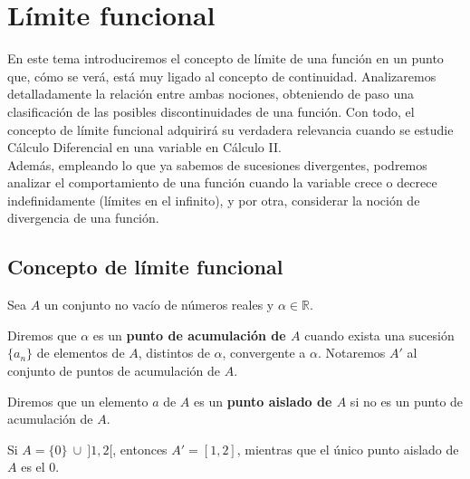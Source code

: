 
\chapter{Límite funcional}\label{chp:Tema13}

En este tema introduciremos el concepto de límite de una función en un punto que, cómo se verá, está muy ligado al concepto de continuidad. Analizaremos detalladamente la relación entre ambas nociones, obteniendo de paso una clasificación de las posibles discontinuidades de una función. Con todo, el concepto de límite funcional adquirirá su verdadera relevancia cuando se estudie Cálculo Diferencial en una variable en Cálculo II.\\

Además, empleando lo que ya sabemos de sucesiones divergentes, podremos analizar el comportamiento de una función cuando la variable crece o decrece indefinidamente (límites en el infinito), y por otra, considerar la noción de divergencia de una función.


\section{Concepto de límite funcional}
\begin{definicion}
    Sea $A$ un conjunto no vacío de números reales y $\alpha \in \mathbb{R}$.
    
    Diremos que $\alpha$ es un \textbf{punto de acumulación de $A$} cuando exista una sucesión $\{a_n\}$ de elementos de $A$,
    distintos de $\alpha$, convergente a $\alpha$. Notaremos $A'$ al conjunto de puntos de acumulación de $A$.
    
    Diremos que un elemento $a$ de $A$ es un \textbf{punto aislado de $A$} si no es un punto de acumulación de $A$.
\end{definicion}
\begin{ejemplo}
    Si $A = \{0\} ~ \cup ~ ]1,2[$, entonces $A'= [1,2]$, mientras que el único punto aislado de $A$ es el $0$.
\end{ejemplo}

